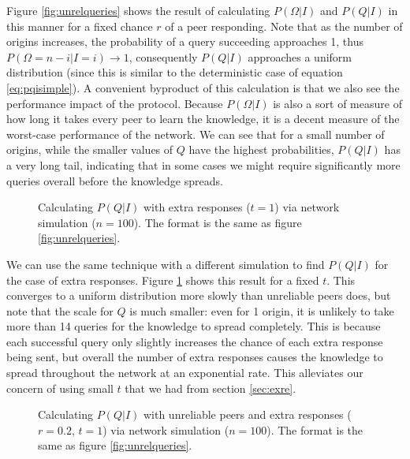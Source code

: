 \documentclass{article}
\newcommand{\eqnref}[1]{equation \eqref{eq:#1}}
\newcommand{\secref}[1]{section \ref{sec:#1}}
\newcommand{\figref}[1]{figure \ref{fig:#1}}
\newcommand{\Figref}[1]{Figure \ref{fig:#1}}
\begin{document}
\Figref{unrelqueries} shows the result of
calculating $P(\Omega|I)$ and $P(Q|I)$ in this manner for a fixed chance $r$ of
a peer responding. Note that as the number of origins increases, the probability
of a query succeeding approaches 1, thus $P(\Omega=n-i|I=i)\rightarrow 1$,
consequently $P(Q|I)$ approaches a uniform distribution (since this is similar
to the deterministic case of \eqnref{pqisimple}). A convenient byproduct of this
calculation is that we also see the performance impact of the protocol.
Because $P(\Omega|I)$ is also a sort of measure of how long it takes every peer
to learn the knowledge, it is a decent measure of the worst-case performance of
the network. We can see that for a small number of origins, while the smaller
values of $Q$ have the highest probabilities, $P(Q|I)$ has a very long tail,
indicating that in some cases we might require significantly more queries
overall before the knowledge spreads.

\begin{figure}%
    \centering
	\caption{Calculating $P(Q|I)$ with extra responses ($t=1$) via network
	simulation ($n=100$). The format is the same as \figref{unrelqueries}.}
    \label{fig:exrequeries}%
\end{figure}

We can use the same technique with a different simulation to find $P(Q|I)$ for
the case of extra responses. \Figref{exrequeries} shows this result for a fixed $t$.
This converges to a uniform distribution more slowly than unreliable peers does,
but note that the scale for $Q$ is much smaller: even for 1 origin, it is
unlikely to take more than 14 queries for the knowledge to spread completely.
This is because each successful query only slightly increases the chance of each
extra response being sent, but overall the number of extra responses causes the
knowledge to spread throughout the network at an exponential rate. This
alleviates our concern of using small $t$ that we had from \secref{exre}.

\begin{figure}%
    \centering
	\caption{Calculating $P(Q|I)$ with unreliable peers and extra responses
	($r=0.2$, $t=1$) via network simulation ($n=100$). The format is the same
	as \figref{unrelqueries}.}
    \label{fig:unexrequeries}%
\end{figure}
\end{document}
